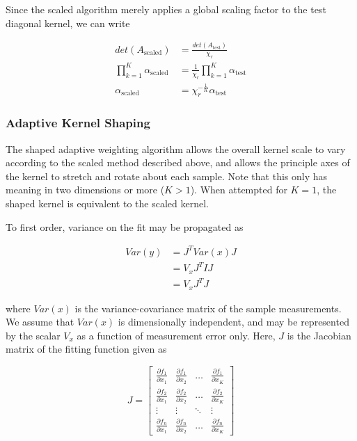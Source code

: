 Since the scaled algorithm merely applies a global scaling factor to the
test diagonal kernel, we can write

\begin{align}
    det(A_{\text{scaled}}) &= \frac{det(A_{\text{test}})}{\chi_r}
    \nonumber \\
    \prod_{k=1}^{K}{\alpha_{\text{scaled}}}
        &= \frac{1}{\chi_r} \prod_{k=1}^{K}{\alpha_{\text{test}}}
    \nonumber \\
    \alpha_{\text{scaled}} &= \chi_r^{-\frac{1}{K}} \alpha_{\text{test}}
    \label{eq:equation40}
\end{align}


\subsubsection{Adaptive Kernel Shaping}
\label{subsubsec:adaptive-kernel-shaping}

The shaped adaptive weighting algorithm allows the overall kernel scale to
vary according to the scaled method described above, and allows the
principle axes of the kernel to stretch and rotate about each sample.
Note that this only has meaning in two dimensions or more ($K > 1$).
When attempted for $K=1$, the shaped kernel is equivalent to the scaled kernel.

To first order, variance on the fit may be propagated as

\begin{align}
    Var(y) &= J^T Var(x) J \nonumber \\
           &= V_x J^T I J \nonumber \\
           &= V_x J^T J
    \label{eq:equation35}
\end{align}

where $Var(x)$ is the variance-covariance matrix of the sample measurements.
We assume that $Var(x)$ is dimensionally independent, and may be represented
by the scalar $V_x$ as a function of measurement error only.
Here, $J$ is the Jacobian matrix of the fitting function given as

\begin{equation}
    J = \begin{bmatrix}
            \frac{\partial f_1}{\partial x_1} &
            \frac{\partial f_1}{\partial x_2} &
            \dots &
            \frac{\partial f_1}{\partial x_K} \\
            \frac{\partial f_2}{\partial x_1} &
            \frac{\partial f_2}{\partial x_2} &
            \dots &
            \frac{\partial f_2}{\partial x_K} \\
            \vdots & \vdots & \ddots & \vdots \\
            \frac{\partial f_n}{\partial x_1} &
            \frac{\partial f_n}{\partial x_2} &
            \dots &
            \frac{\partial f_n}{\partial x_K}
        \end{bmatrix}
    \label{eq:equation41}
\end{equation}


